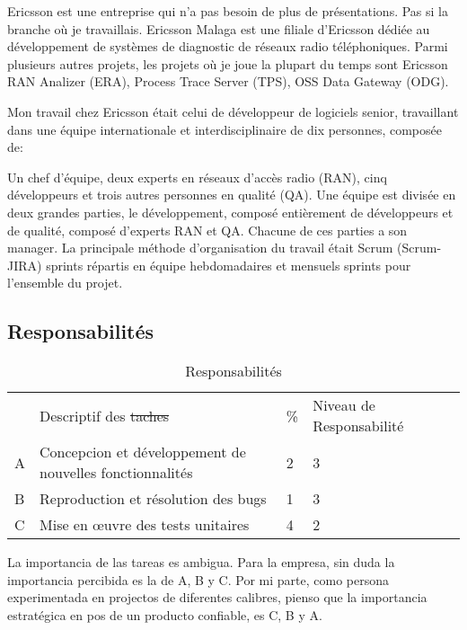 \documentclass{resume} %
\providecommand{\DIFaddtex}[1]{{\protect\color{blue}\uwave{#1}}} %
\providecommand{\DIFdeltex}[1]{{\protect\color{red}\sout{#1}}}                      %
\providecommand{\DIFaddFL}[1]{\DIFadd{#1}} %
\providecommand{\DIFdelFL}[1]{\DIFdel{#1}} %
\providecommand{\DIFaddbeginFL}{} %
\providecommand{\DIFaddendFL}{} %
\providecommand{\DIFdelbeginFL}{} %
\providecommand{\DIFdelendFL}{} %
\providecommand{\DIFadd}[1]{\texorpdfstring{\DIFaddtex{#1}}{#1}} %
\providecommand{\DIFdel}[1]{\texorpdfstring{\DIFdeltex{#1}}{}} %
\begin{document}
Ericsson est une entreprise qui n'a pas besoin de plus de présentations. Pas si la branche où je travaillais.
Ericsson Malaga est une filiale d'Ericsson dédiée au développement de systèmes de diagnostic de réseaux radio téléphoniques.
Parmi plusieurs autres projets, les projets où je joue la plupart du temps sont Ericsson RAN \footnotemark Analizer  (ERA), Process Trace Server (TPS), OSS Data Gateway (ODG). 


Mon travail chez Ericsson était celui de développeur de logiciels senior, travaillant dans une équipe internationale et interdisciplinaire de dix personnes, composée de:

Un chef d'équipe, deux experts en réseaux d'accès radio (RAN), cinq développeurs et trois autres personnes en qualité (QA).
Une équipe est divisée en deux grandes parties, le développement, composé entièrement de développeurs et de qualité, composé d'experts RAN et QA. Chacune de ces parties a son manager.
La principale méthode d'organisation du travail était Scrum (Scrum-JIRA) sprints répartis en équipe hebdomadaires et mensuels sprints pour l'ensemble du projet.


\subsection{Responsabilités}

	
\begin{table}[!htbp]
\label{my-label}
\begin{tabular}{|l|l|l|l|l}
\cline{1-4}
   & Descriptif des \DIFdelbeginFL \DIFdelFL{taches }\DIFdelendFL \DIFaddbeginFL \DIFaddFL{tâches }\DIFaddendFL &  \% & Niveau de Responsabilité \footnotemark  &  \\ \cline{1-4}  
A & Concepcion et développement de nouvelles fonctionnalités & 2 & 3 & \\ \cline {1-4}
B & Reproduction et résolution des bugs & 1 & 3 & \\ \cline {1-4}
C & Mise en œuvre des tests unitaires & 4 & 2 & \\ \cline {1-4}
\end{tabular}
\caption{Responsabilités}
\end{table}

La importancia de las tareas es ambigua. Para la empresa, sin duda la importancia percibida es la de A, B y C. Por mi parte, como persona experimentada en projectos de diferentes calibres, pienso que la importancia estratégica en pos de un producto confiable, es C, B y A.
\end{document}
